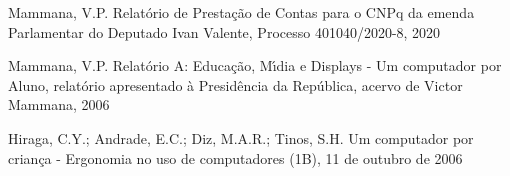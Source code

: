 \documentclass[
12pt,		%
openright,	%
twoside,  %
a4paper,			%
chapter=TITLE,		%
english,			%
french,				%
spanish,			%
brazil				%
]{USPSC-classe/USPSC}
\begin{document}
\begin{flushleft}
\begin{flushleft}
\begin{flushleft}
\begin{flushleft}
[MAMMANA et al., 2020b] Mammana, V.P. Relat\'orio de Presta\c{c}\~ao de Contas para o CNPq da emenda Parlamentar do Deputado Ivan Valente, Processo 401040/2020-8, 2020
\end{flushleft}


\end{flushleft}


\end{flushleft}


\end{flushleft}


\begin{flushleft}
\begin{flushleft}
\begin{flushleft}


\end{flushleft}


\end{flushleft}


\end{flushleft}


\begin{flushleft}
\begin{flushleft}
\begin{flushleft}
\begin{flushleft}
[MAMMANA, 2006] Mammana, V.P. Relat\'orio A: Educa\c{c}\~ao, M\'{\i}dia e Displays - Um computador por Aluno, relat\'orio apresentado \`a Presid\^encia da Rep\'ublica, acervo de Victor Mammana, 2006
\end{flushleft}


\end{flushleft}


\end{flushleft}


\end{flushleft}


\begin{flushleft}
\begin{flushleft}
\begin{flushleft}
\begin{flushleft}
[HIRAGA et al., 2006] Hiraga, C.Y.; Andrade, E.C.; Diz, M.A.R.; Tinos, S.H. Um computador por crian\c{c}a - Ergonomia no uso de computadores (1B), 11 de outubro de 2006
\end{flushleft}


\end{flushleft}


\end{flushleft}


\end{flushleft}
\end{document}
